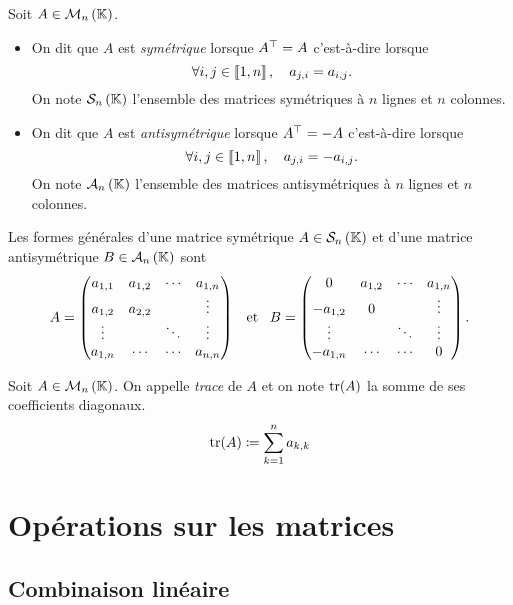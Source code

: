 \documentclass{magnolia}
\begin{document}
\begin{definition}[utile=-3]
Soit $A\in\mathcal{M}_{n}\left(\mathbb{K}\right)$.
\begin{itemize}
\item On dit que $A$ est \emph{symétrique} lorsque ${A}^{\top}=A$ c'est-à-dire
  lorsque
  \[\forall i,j\in\left\llbracket 1,n\right\rrbracket ,\quad a_{j,i}=a_{i,j}.\]
  On note $\mathcal{S}_n\left(\mathbb{K}\right)$ l'ensemble des matrices symétriques à $n$
  lignes et $n$ colonnes.
\item On dit que $A$ est \emph{antisymétrique} lorsque ${A}^{\top}=-A$ c'est-à-dire
  lorsque
  \[\forall i,j\in\left\llbracket 1,n\right\rrbracket ,\quad a_{j,i}=-a_{i,j}.\]
  On note $\mathcal{A}_n\left(\mathbb{K}\right)$ l'ensemble des matrices antisymétriques à $n$
  lignes et $n$ colonnes.
\end{itemize}
\end{definition}

\begin{remarqueUnique}
\remarque Les formes générales d'une matrice symétrique
  $A\in\mathcal{S}_n\left(\mathbb{K}\right)$ et d'une matrice antisymétrique 
  $B\in\mathcal{A}_n\left(\mathbb{K}\right)$ sont
  \[A=
  \begin{pmatrix}
  a_{1,1} & a_{1,2} &  \cdots & a_{1,n}\\
  a_{1,2} & a_{2,2} &        & \vdots\\
  \vdots  &     & \ddots & \vdots\\
  a_{1,n} & \cdots  & \cdots & a_{n,n}
  \end{pmatrix}
  \quad\!\text{et}\quad\!
  B=
  \begin{pmatrix}
  0 & a_{1,2} &  \cdots & a_{1,n}\\
  -a_{1,2} & 0 &        & \vdots\\
  \vdots  &     & \ddots & \vdots\\
  -a_{1,n} & \cdots  & \cdots & 0
  \end{pmatrix}.\]
\end{remarqueUnique}

\begin{definition}[utile=-3]
  Soit $A\in\mathcal{M}_{n}\left(\mathbb{K}\right)$. On appelle \emph{trace} de $A$ et on note $\operatorname{tr}(A)$ la somme de
  ses coefficients diagonaux.
  \[\operatorname{tr}(A)\coloneqq\sum_{k=1}^n a_{k,k}\]
  \end{definition}

\section{Opérations sur les matrices}

\subsection{Combinaison linéaire}
\end{document}
